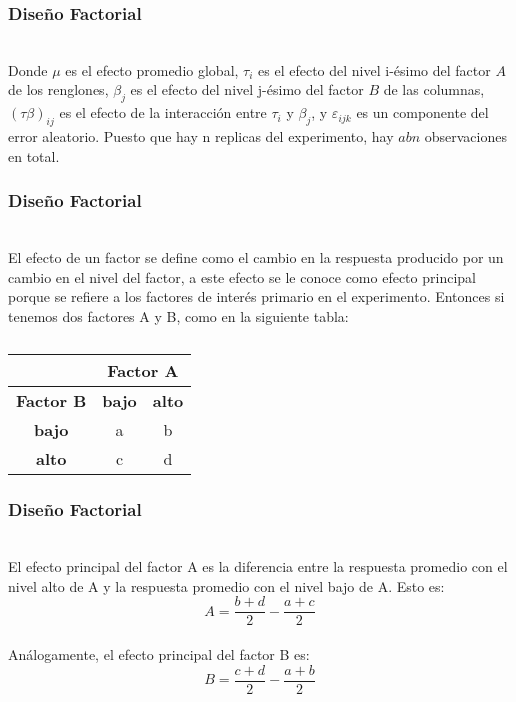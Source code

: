\documentclass[12pt]{beamer}
\begin{document}
\begin{frame}
\frametitle{Diseño Factorial}

~\\Donde $\mu$ es el efecto promedio global, $\tau_i$ es el efecto del nivel i-ésimo del factor $A$ de los renglones, $\beta_j$ es el efecto del nivel j-ésimo del factor $B$ de las columnas, $(\tau\beta)_{ij}$ es el efecto de la interacción entre $\tau_i$ y $\beta_j$, y $\varepsilon_{ijk}$ es un componente del error aleatorio. Puesto que hay n replicas del experimento, hay $abn$ observaciones en total.

\end{frame}

\begin{frame}
\frametitle{Diseño Factorial}
~\\El efecto de un factor se define como el cambio en la respuesta producido por un cambio en el nivel del factor, a este efecto se le conoce como efecto principal porque se refiere a los factores de interés primario en el experimento. Entonces si tenemos dos factores A y B, como en la siguiente tabla:
~\\
\begin{table}[htbp]
  \centering
  \caption{}
    \begin{tabular}{|c|c|c|}
\cline{2-3}    \multicolumn{1}{c|}{} & \multicolumn{2}{c|}{\textbf{Factor A}} \\
    \hline
    \textbf{Factor B} & \textbf{bajo } & \textbf{alto} \\
    \hline
    \textbf{bajo} & a     & b  \\
    \hline
    \textbf{alto} & c     & d  \\
    \hline
    \end{tabular}%
  \label{tab:addlabel}%
\end{table}%
\end{frame}

\begin{frame}
\frametitle{Diseño Factorial}
~\\El efecto principal del factor A es la diferencia entre la respuesta promedio con el nivel alto de A y la respuesta promedio con el nivel bajo de A. Esto es:
$$A=\frac{b+d}{2}-\frac{a+c}{2}$$
~\\Análogamente, el efecto principal del factor B es:
$$B=\frac{c+d}{2}-\frac{a+b}{2}$$  
\end{frame}
\end{document}
